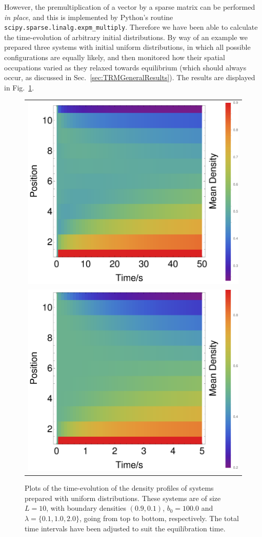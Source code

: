However, the premultiplication of a vector by a sparse matrix can be performed \textit{in place},
and this is implemented by Python's routine \texttt{scipy.sparse.linalg.expm\_multiply}. Therefore
we have been able to calculate the time-evolution of arbitrary initial distributions. By way of an
example we prepared three systems with initial uniform distributions, in which all possible 
configurations are equally likely, and then monitored how their spatial occupations varied as they
relaxed towards equilibrium (which should always occur, as discussed in 
Sec.~\ref{sec:TRMGeneralResults}). The results are displayed in Fig.~\ref{fig:TRMTimeDep}.
\begin{figure}
\caption[The time-evolution of uniform distributions to equilibrium.]{Plots of the time-evolution
of the density profiles of systems prepared with uniform distributions. These systems are of
size $L=10$, with boundary densities $(0.9, 0.1)$, $b_0=100.0$ and $\lambda= \{ 0.1, 1.0, 2.0 \}$,
going from top to bottom, respectively. The total time intervals have been adjusted to suit the 
equilibration time.} \label{fig:TRMTimeDep}
\begin{center}
 \begin{tabular}{c}
    \includegraphics[width=0.6\linewidth]{TRM/images/timeSeriesl0_1}  \\ 
    \includegraphics[width=0.6\linewidth]{TRM/images/timeSeriesl1_0}  \\

\end{tabular}
\end{center}
\end{figure}
